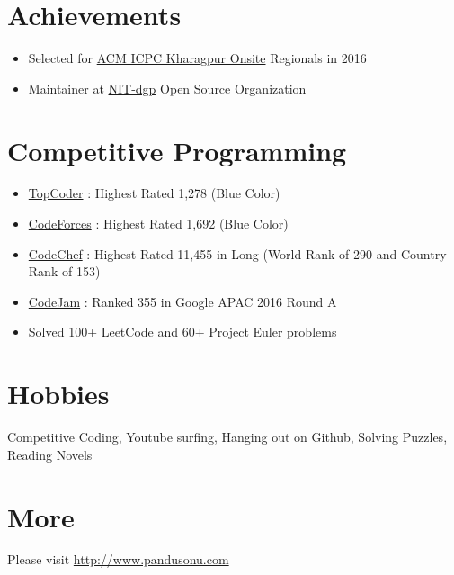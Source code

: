 \documentclass[margin, centered]{res}
\begin{document}
\begin{resume}
\section{Achievements}
\begin{itemize}[leftmargin=*]
 \item Selected for \href{acm.iitkgp.ac.in}{ACM ICPC Kharagpur Onsite} Regionals in 2016
 \item Maintainer at \href{https://github.com/NIT-dgp}{NIT-dgp} Open Source Organization
\end{itemize}


\section{Competitive Programming}
\begin{itemize}[leftmargin=*]
 \item \href{https://www.topcoder.com/members/pandusonu/details/?track=DATA_SCIENCE&subTrack=SRM}{TopCoder} : Highest Rated 1,278 (Blue Color)
 \item \href{http://codeforces.com/profile/pandusonu}{CodeForces} : Highest Rated 1,692 (Blue Color)
 \item \href{https://www.codechef.com/users/pandusonu}{CodeChef} : Highest Rated 11,455 in Long (World Rank of 290 and Country Rank of 153)
 \item \href{https://code.google.com/codejam/contest/11274486/scoreboard#sp=331}{CodeJam} : Ranked 355 in Google APAC 2016 Round A
 \item Solved 100+ LeetCode and 60+ Project Euler problems
\end{itemize}


\section{Hobbies}
Competitive Coding, Youtube surfing, Hanging out on Github, Solving Puzzles, Reading Novels

\section{More}
Please visit \href{http://www.pandusonu.com}{http://www.pandusonu.com}

\end{resume}
\end{document}
